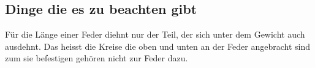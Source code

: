 \documentclass[../main.tex]{subfiles} %
\begin{document}
    \subsection{Dinge die es zu beachten gibt}\label{subsec:dinge-die-es-zu-beachten-gibt}
    Für die Länge einer Feder diehnt nur der Teil, der sich unter dem Gewicht auch ausdehnt. 
    Das heisst die Kreise die oben und unten an der Feder angebracht sind zum sie befestigen gehören nicht zur Feder dazu.    
\end{document}
